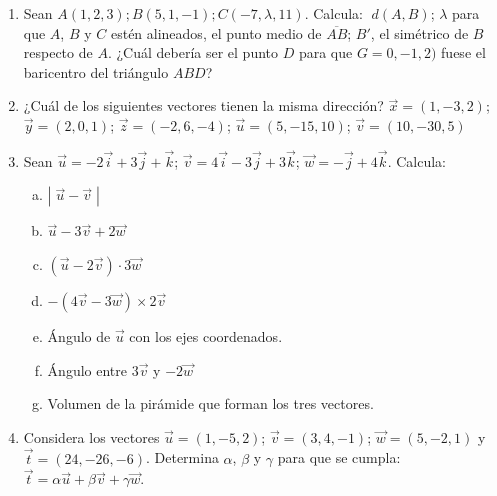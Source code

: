\begin{enumerate}

\item Sean $A(1,2,3); B(5,1,-1); C(-7,\lambda,11)$. Calcula: $\; d(A,B)$; $\lambda$ para que $A$, $B$ y $C$ estén alineados, el punto medio de $\overline{AB}$; $B'$, el simétrico de $B$ respecto de $A$. ¿Cuál debería ser el punto $D$ para que $G=0,-1,2)$ fuese el baricentro del triángulo $ABD$?

\vspace{2mm}

\item ¿Cuál de los siguientes vectores tienen la misma dirección? $\vec x=(1,-3,2)$; $\vec y=(2,0,1)$; $\vec z=(-2,6,-4)$; $\vec u=(5,-15,10)$; $\vec v=(10,-30,5)$

\vspace{2mm}

\item Sean $\vec u=-2\vec i+3\vec j+\vec k$; $\vec v=4\vec i-3\vec j+3\vec k$; $\vec w=-\vec j+4\vec k$. Calcula:
\begin{multicols}{2}
\begin{enumerate}[a) ]
\item $|\;\vec u - \vec v\;|$
\item $\vec u - 3\vec v+2\vec w$
\item $(\vec u -2\vec v)\cdot 3\vec w$
\item $-(4\vec v-3\vec w)\times 2\vec v$
\item Ángulo de $\vec u$ con los ejes coordenados.
\item Ángulo entre $3\vec v$ y $-2\vec w$
\item Volumen de la pirámide que forman los tres vectores.
\end{enumerate}
\end{multicols}
\vspace{2mm}

\item Considera los vectores $\vec u=(1,-5,2)$; $\vec v=(3,4,-1)$; $\vec w=(5,-2,1)$ y $\vec t=(24,-26,-6)$. Determina $\alpha$, $\beta$ y $\gamma$ para que se cumpla:  
$  \vec t = \alpha \vec u + \beta \vec v + \gamma \vec w$.


\end{enumerate}
